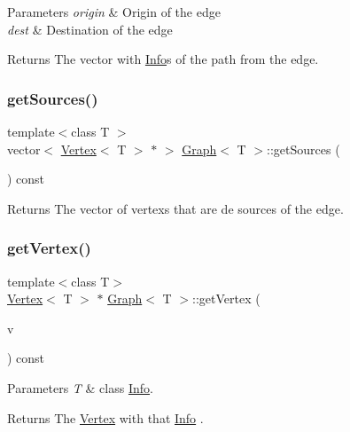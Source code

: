 \begin{DoxyParams}{Parameters}
{\em origin} & Origin of the edge \\
\hline
{\em dest} & Destination of the edge \\
\hline
\end{DoxyParams}
\begin{DoxyReturn}{Returns}
The vector with \hyperlink{class_info}{Info}\textquotesingle{}s of the path from the edge. 
\end{DoxyReturn}
\mbox{\label{class_graph_a947115150a94f88ac9aedbcec59dd07e}} 
\subsubsection{\texorpdfstring{get\+Sources()}{getSources()}}
{\footnotesize\ttfamily template$<$class T $>$ \\
vector$<$ \hyperlink{class_vertex}{Vertex}$<$ T $>$ $\ast$ $>$ \hyperlink{class_graph}{Graph}$<$ T $>$\+::get\+Sources (\begin{DoxyParamCaption}{ }\end{DoxyParamCaption}) const}

\begin{DoxyReturn}{Returns}
The vector of vertexs that are de sources of the edge. 
\end{DoxyReturn}
\mbox{\label{class_graph_a67453d232f04e85c642b51554df1bc6a}} 
\subsubsection{\texorpdfstring{get\+Vertex()}{getVertex()}}
{\footnotesize\ttfamily template$<$class T$>$ \\
\hyperlink{class_vertex}{Vertex}$<$ T $>$ $\ast$ \hyperlink{class_graph}{Graph}$<$ T $>$\+::get\+Vertex (\begin{DoxyParamCaption}\item[{const T \&}]{v }\end{DoxyParamCaption}) const}


\begin{DoxyParams}{Parameters}
{\em T} & class \hyperlink{class_info}{Info}.\\
\hline
\end{DoxyParams}
\begin{DoxyReturn}{Returns}
The \hyperlink{class_vertex}{Vertex} with that \hyperlink{class_info}{Info} . 
\end{DoxyReturn}
\mbox{\label{class_graph_ae4591fdf391d3a06a77a3394b7336cfa}} 
